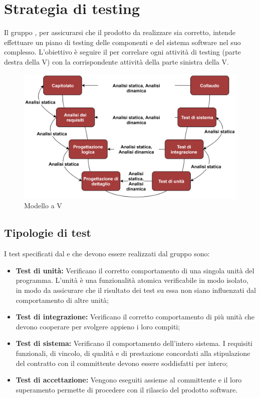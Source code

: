 \section{Strategia di testing}
Il gruppo \Gruppo{}, per assicurarsi che il prodotto da realizzare sia corretto, intende effettuare un piano di testing delle componenti e del sistema software nel suo complesso.
L'obiettivo è seguire il  per correlare ogni attività di testing (parte destra della V) con la corrispondente attività della parte sinistra della V.

\begin{figure}[h]
    \centering
    \includegraphics[scale=0.85]{Sezioni/Immagini/ModelloV.png}
    \caption{Modello a V}
\end{figure}

\subsection{Tipologie di test}
I test specificati dal  e che devono essere realizzati dal gruppo sono:
\begin{itemize}
    \item \textbf{Test di unità:} Verificano il corretto comportamento di una singola unità del programma. L'unità è una funzionalità atomica verificabile in modo isolato, in modo da assicurare che il risultato dei test su essa non siano influenzati dal comportamento di altre unità; 
    \item \textbf{Test di integrazione:} Verificano il corretto comportamento di più unità che devono cooperare per svolgere appieno i loro compiti;
    \item \textbf{Test di sistema:} Verificano il comportamento dell'intero sistema. I requisiti funzionali, di vincolo, di qualità e di prestazione concordati alla stipulazione del contratto con il committente devono essere soddisfatti per intero;
    \item \textbf{Test di accettazione:} Vengono eseguiti assieme al committente e il loro superamento permette di procedere con il rilascio del prodotto software.
\end{itemize}

